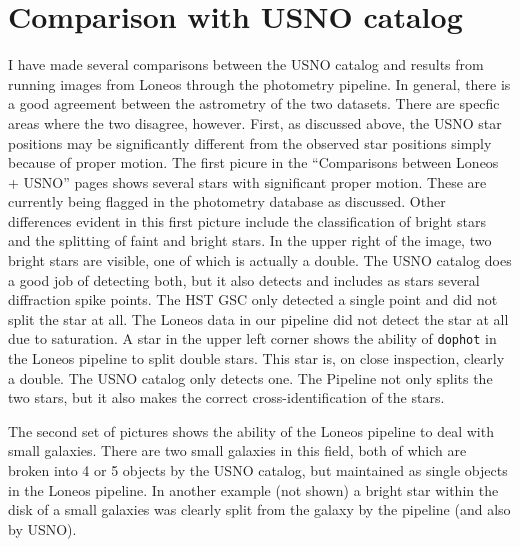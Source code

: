 \documentclass{article}
\begin{document}
\section {Comparison with USNO catalog}

I have made several comparisons between the USNO catalog and results
from running images from Loneos through the photometry pipeline.  In
general, there is a good agreement between the astrometry of the two
datasets.  There are specfic areas where the two disagree, however.
First, as discussed above, the USNO star positions may be
significantly different from the observed star positions simply
because of proper motion.  The first picure in the ``Comparisons
between Loneos + USNO'' pages shows several stars with significant
proper motion.  These are currently being flagged in the photometry
database as discussed.  Other differences evident in this first
picture include the classification of bright stars and the splitting
of faint and bright stars.  In the upper right of the image, two
bright stars are visible, one of which is actually a double.  The USNO
catalog does a good job of detecting both, but it also detects and
includes as stars several diffraction spike points.  The HST GSC only
detected a single point and did not split the star at all.  The Loneos
data in our pipeline did not detect the star at all due to saturation.
A star in the upper left corner shows the ability of {\tt dophot} in
the Loneos pipeline to split double stars.  This star is, on close
inspection, clearly a double.  The USNO catalog only detects one.  The
Pipeline not only splits the two stars, but it also makes the correct
cross-identification of the stars.  

The second set of pictures shows the ability of the Loneos pipeline to
deal with small galaxies.  There are two small galaxies in this field,
both of which are broken into 4 or 5 objects by the USNO catalog, but
maintained as single objects in the Loneos pipeline.  In another
example (not shown) a bright star within the disk of a small galaxies
was clearly split from the galaxy by the pipeline (and also by USNO).
\end{document}

